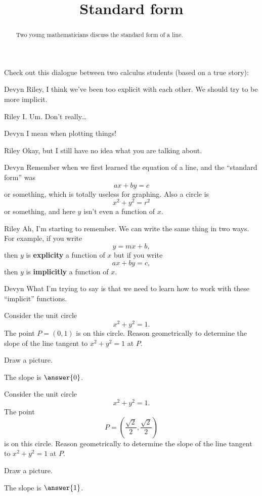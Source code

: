 \documentclass{ximera}
\title[Break-Ground:]{Standard form}
\begin{document}
\begin{abstract}
  Two young mathematicians discuss the standard form of a line.
\end{abstract}
\maketitle

Check out this dialogue between two calculus students (based on a true
story):

\begin{dialogue}
\item[Devyn] Riley, I think we've been too explicit with each
  other. We should try to be more implicit.
\item[Riley] I. Um. Don't really\dots
\item[Devyn] I mean when plotting things!
\item[Riley] Okay, but I still have no idea what you are talking about.
\item[Devyn] Remember when we first learned the equation of a line, and the ``standard form'' was
  \[
  ax+by = c
  \]
  or something, which is totally useless for graphing. Also a circle is
  \[
  x^2 + y^2 = r^2
  \]
  or something, and here $y$ isn't even a function of
  $x$. 
\item[Riley] Ah, I'm starting to remember.  We can write the same thing in two ways.  For example, if you write
  \[
  y = mx + b, %
  \]
 then $y$ is {\bf explicity} a function of $x$ but if you write
    \[
  ax + by = c, %
  \]
  then $y$ is {\bf implicitly} a function of $x$.
\item[Devyn] What I'm trying to say is that we need to learn how to
  work with these ``implicit'' functions. 
\end{dialogue}

\begin{problem}
  Consider the unit circle
  \[
  x^2 + y^2 = 1.
  \]
  The point $P=(0,1)$ is on this circle. Reason geometrically to
  determine the slope of the line tangent to $x^2 + y^2 = 1$ at
  $P$.
  \begin{hint}
    Draw a picture.
  \end{hint}
  \begin{prompt}
    The slope is $\answer{0}$.
  \end{prompt}
\end{problem}

\begin{problem}
  Consider the unit circle
  \[
  x^2 + y^2 = 1.
  \]
  The point
  \[
  P=\left(\frac{\sqrt{2}}{2},\frac{\sqrt{2}}{2}\right)
  \]
  is on this circle. Reason geometrically to determine the slope of
  the line tangent to $x^2 + y^2 = 1$ at $P$.
  \begin{hint}
    Draw a picture.
  \end{hint}
  \begin{prompt}
    The slope is $\answer{1}$.
  \end{prompt}
\end{problem}




%
\end{document}
